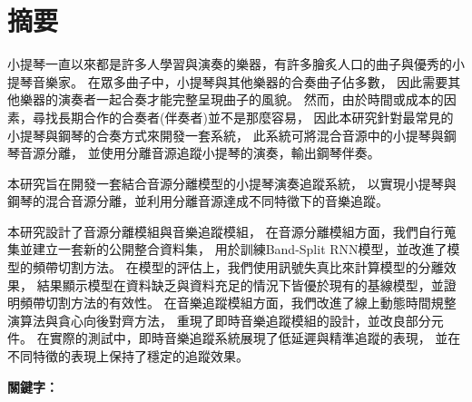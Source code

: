 \documentclass[class=NCU_thesis, crop=false]{standalone}
\begin{document}
\chapter{摘要}
小提琴一直以來都是許多人學習與演奏的樂器，有許多膾炙人口的曲子與優秀的小提琴音樂家。
在眾多曲子中，小提琴與其他樂器的合奏曲子佔多數，
因此需要其他樂器的演奏者一起合奏才能完整呈現曲子的風貌。
然而，由於時間或成本的因素，尋找長期合作的合奏者(伴奏者)並不是那麼容易，
因此本研究針對最常見的小提琴與鋼琴的合奏方式來開發一套系統，
此系統可將混合音源中的小提琴與鋼琴音源分離，
並使用分離音源追蹤小提琴的演奏，輸出鋼琴伴奏。

本研究旨在開發一套結合音源分離模型的小提琴演奏追蹤系統，
以實現小提琴與鋼琴的混合音源分離，並利用分離音源達成不同特徵下的音樂追蹤。

本研究設計了音源分離模組與音樂追蹤模組，
在音源分離模組方面，我們自行蒐集並建立一套新的公開整合資料集，
用於訓練Band-Split RNN模型，並改進了模型的頻帶切割方法。
在模型的評估上，我們使用訊號失真比來計算模型的分離效果，
結果顯示模型在資料缺乏與資料充足的情況下皆優於現有的基線模型，並證明頻帶切割方法的有效性。
在音樂追蹤模組方面，我們改進了線上動態時間規整演算法與貪心向後對齊方法，
重現了即時音樂追蹤模組的設計，並改良部分元件。
在實際的測試中，即時音樂追蹤系統展現了低延遲與精準追蹤的表現，
並在不同特徵的表現上保持了穩定的追蹤效果。


\vspace{2em}
\noindent \textbf{關鍵字：} \keywordsZh{} %
\end{document}
